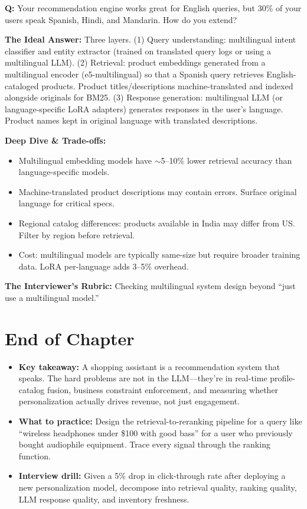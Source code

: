 \textbf{Q:} Your recommendation engine works great for English queries, but 30\% of your users speak Spanish, Hindi, and Mandarin. How do you extend?

\textbf{The Ideal Answer:} Three layers. (1) Query understanding: multilingual intent classifier and entity extractor (trained on translated query logs or using a multilingual LLM). (2) Retrieval: product embeddings generated from a multilingual encoder (e5-multilingual) so that a Spanish query retrieves English-cataloged products. Product titles/descriptions machine-translated and indexed alongside originals for BM25. (3) Response generation: multilingual LLM (or language-specific LoRA adapters) generates responses in the user's language. Product names kept in original language with translated descriptions.

\textbf{Deep Dive \& Trade-offs:}
\begin{itemize}
  \item Multilingual embedding models have $\sim$5--10\% lower retrieval accuracy than language-specific models.
  \item Machine-translated product descriptions may contain errors. Surface original language for critical specs.
  \item Regional catalog differences: products available in India may differ from US. Filter by region before retrieval.
  \item Cost: multilingual models are typically same-size but require broader training data. LoRA per-language adds 3--5\% overhead.
\end{itemize}

\textbf{The Interviewer's Rubric:} Checking multilingual system design beyond ``just use a multilingual model.''

\section*{End of Chapter}

\begin{itemize}
  \item \textbf{Key takeaway:} A shopping assistant is a recommendation system that speaks. The hard problems are not in the LLM---they're in real-time profile-catalog fusion, business constraint enforcement, and measuring whether personalization actually drives revenue, not just engagement.
  \item \textbf{What to practice:} Design the retrieval-to-reranking pipeline for a query like ``wireless headphones under \$100 with good bass'' for a user who previously bought audiophile equipment. Trace every signal through the ranking function.
  \item \textbf{Interview drill:} Given a 5\% drop in click-through rate after deploying a new personalization model, decompose into retrieval quality, ranking quality, LLM response quality, and inventory freshness.
\end{itemize}
